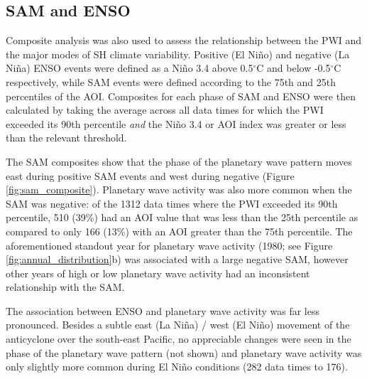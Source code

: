 \subsection{SAM and ENSO}

Composite analysis was also used to assess the relationship between the PWI and the major modes of SH climate variability. Positive (El Ni\~{n}o) and negative (La Ni\~{n}a) ENSO events were defined as a Ni\~{n}o 3.4 above 0.5$^{\circ}$C and below -0.5$^{\circ}$C respectively, while SAM events were defined according to the 75th and 25th percentiles of the AOI. Composites for each phase of SAM and ENSO were then calculated by taking the average across all data times for which the PWI exceeded its 90th percentile \textit{and} the Ni\~{n}o 3.4 or AOI index was greater or less than the relevant threshold. 

The SAM composites show that the phase of the planetary wave pattern moves east during positive SAM events and west during negative (Figure \ref{fig:sam_composite}). Planetary wave activity was also more common when the SAM was negative: of the 1312 data times where the PWI exceeded its 90th percentile, 510 (39\%) had an AOI value that was less than the 25th percentile as compared to only 166 (13\%) with an AOI greater than the 75th percentile. The aforementioned standout year for planetary wave activity (1980; see Figure \ref{fig:annual_distribution}b) was associated with a large negative SAM, however other years of high or low planetary wave activity had an inconsistent relationship with the SAM.

The association between ENSO and planetary wave activity was far less pronounced. Besides a subtle east (La Ni\~{n}a) / west (El Ni\~{n}o) movement of the anticyclone over the south-east Pacific, no appreciable changes were seen in the phase of the planetary wave pattern (not shown) and planetary wave activity was only slightly more common during El Ni\~{n}o conditions (282 data times to 176).      